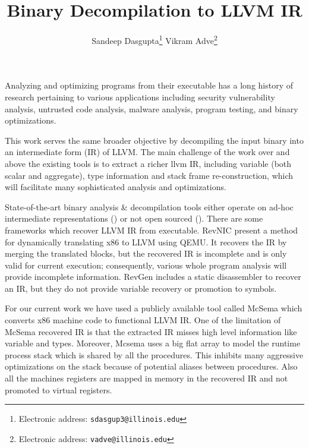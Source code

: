 \documentclass[10pt,twoside]{article}
\date{}
\title{\textbf{ Binary Decompilation to LLVM IR}}
\author{Sandeep Dasgupta\thanks{Electronic address: \texttt{sdasgup3@illinois.edu}}
\qquad Vikram Adve\thanks{Electronic address: \texttt{vadve@illinois.edu}}
}
\begin{document}
\thispagestyle{empty}

\maketitle

Analyzing and optimizing programs from their executable has a long history of
research pertaining to various applications including  security vulnerability
analysis, untrusted code analysis, malware analysis, program testing, and
binary optimizations. 

This work serves the same broader objective by decompiling the input binary
into an intermediate form (IR) of LLVM.  The main challenge of the work over
and above the existing tools is to extract a richer llvm IR, including variable
(both scalar and aggregate), type information and stack frame re-construction,
which will facilitate many sophisticated analysis and optimizations.

State-of-the-art binary analysis \& decompilation tools either operate on
ad-hoc intermediate representations (\cite{HexRays, Codesurfer, BAP}) or not
open sourced (\cite{HexRays, Codesurfer, BAP,SECONDWRITE-EUROSYS-2013,
DIVINE-VMCAI-2007,POLYTYPEINFERENCE-PLDI-2016}).  There are some frameworks
which recover LLVM IR from executable.  RevNIC \cite{REVNIC-EUROSYS-2010}
present a method for dynamically translating x86 to LLVM using
QEMU\cite{QEMU-ATEC-2005}.  It recovers the IR by merging the translated
blocks, but the recovered IR is incomplete and is only valid for current
execution; consequently, various whole program analysis will provide incomplete
information. RevGen \cite{REVGEN-DNSW-2011} includes a static disassembler to
recover an IR, but they do not provide variable recovery or promotion to symbols.
  

For our current work we have used a publicly available tool called McSema
\cite{Mcsema}  which converts x86 machine code to functional LLVM IR.  
One of the limitation of McSema recovered IR is that the
extracted IR misses high level information like variable and types.  Moreover,
Mcsema uses a big flat array to model the runtime process stack which is shared
by all the procedures. This inhibits many aggressive optimizations on the stack
because of potential aliases between procedures. Also all the machines
registers are mapped in memory in the recovered IR and not promoted to virtual
registers. 
\end{document}
